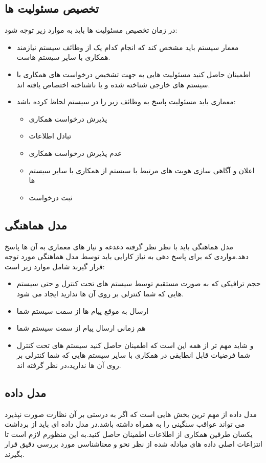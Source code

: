 \subsection{تخصیص مسئولیت ها} 
در زمان تخصیص مسئولیت ها باید  به موارد زیر توجه شود:
\begin{itemize}
\item
معمار سیستم باید مشخص کند که انجام کدام یک از وظائف سیستم نیازمند همکاری با سایر سیستم هاست.
\item
اطمینان حاصل کنید مسئولیت هایی به جهت تشخیص درخواست های همکاری با سیستم های خارجی شناخته شده و یا ناشناخته اختصاص یافته اند.
\item
معماری باید مسئولیت پاسخ به وظائف زیر را در سیستم لحاظ کرده باشد:
\begin{itemize}
\item
پذیرش درخواست همکاری
\item
تبادل اطلاعات
\item
عدم پذیرش درخواست همکاری
\item
اعلان و آگاهی سازی هویت های مرتبط با سیستم از همکاری با سایر سیستم ها
\item
ثبت درخواست
\end{itemize}
\end{itemize}
\subsection{مدل هماهنگی}
مدل هماهنگی باید با نظر نظر گرفته دغدغه و نیاز های معماری به آن ها پاسخ دهد.مواردی که برای پاسخ دهی به نیاز کارایی باید توسط مدل هماهنگی مورد توجه قرار گیرند شامل موارد زیر است:
\begin{itemize}
\item
حجم ترافیکی که به صورت مستقیم توسط سیستم های تحت کنترل و حتی سیستم هایی که شما کنترلی بر روی آن ها ندارید ایجاد می شود.
\item
ارسال به موقع پیام ها از سمت سیستم شما
\item
هم زمانی ارسال پیام از سمت سیستم شما
\item
و شاید مهم تر از همه این است که اطمینان حاصل کنید سیستم های تحت کنترل شما فرضیات قابل انطابقی در همکاری با سایر سیستم هایی که شما کنترلی بر روی آن ها ندارید،‌در نظر گرفته اند.
\end{itemize}
\subsection{مدل داده}
مدل داده  از مهم ترین بخش هایی است که اگر به درستی بر آن نظارت صورت نپذیرد می تواند عواقب سنگینی را به همراه داشته باشد.در مدل داده ای باید از برداشت یکسان طرفین همکاری از اطلاعات اطمینان حاصل کنید.به این منظورم لازم است تا انتزاعات اصلی داده های مبادله شده از نظر نحو و معناشناسی مورد بررسی دقیق قرار بگیرند.
